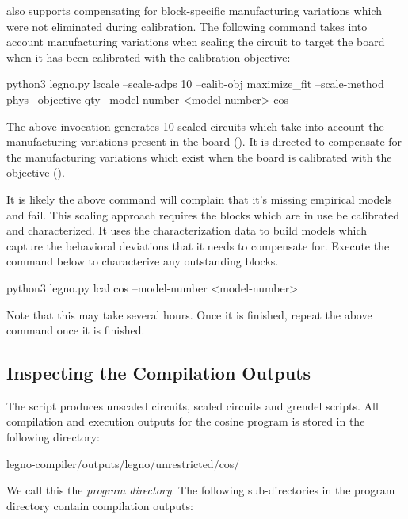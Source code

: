  also supports compensating for block-specific manufacturing
variations which were not eliminated during calibration. The following command
takes into account manufacturing variations when scaling the circuit to target
the board  when it has been calibrated with the
 calibration objective:


\begin{snippet}
  python3 legno.py lscale --scale-adps 10 --calib-obj maximize_fit
  --scale-method phys --objective qty --model-number <model-number> cos
\end{snippet}


The above invocation generates 10 scaled circuits which take into account the
manufacturing variations present in the board ().
It is directed to compensate for the manufacturing variations which exist when
the board is calibrated with the  objective ().

It is likely the above command will complain that it's missing empirical models
and fail. This scaling approach requires the blocks which are in use be
calibrated and characterized. It uses the characterization data to build models
which capture the behavioral deviations that it needs to compensate for. Execute
the command below to characterize any outstanding blocks.

\begin{snippet}
  python3 legno.py lcal cos --model-number <model-number>
\end{snippet}

Note that this may take several hours. Once it is finished, repeat the above
 command once it is finished.

\subsection{Inspecting the Compilation Outputs}

The  script produces unscaled circuits, scaled circuits and
grendel scripts. All compilation and execution outputs for the cosine program is
stored in the following directory:

\begin{snippet}
  legno-compiler/outputs/legno/unrestricted/cos/
\end{snippet}

We call this the \textit{program directory}. The following sub-directories in the
program directory contain compilation outputs:

